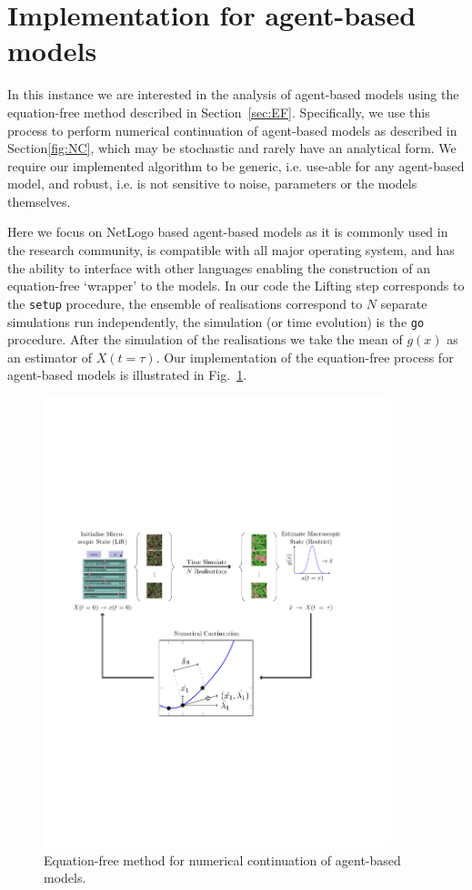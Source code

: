 \documentclass[11pt]{article}
\begin{document}
\section{Implementation for agent-based models}
\label{sec:IMP}
In this instance we are interested in the analysis of agent-based models using the equation-free method described in Section~\ref{sec:EF}. Specifically, we use this process to perform numerical continuation of agent-based models as described in Section\ref{fig:NC}, which may be stochastic and rarely have an analytical form. We require our implemented algorithm to be generic, i.e. use-able for any agent-based model, and robust, i.e. is not sensitive to noise, parameters or the models themselves. 

Here we focus on NetLogo based agent-based models as it is commonly used in the research community, is compatible with all major operating system, and has the ability to interface with other languages enabling the construction of an equation-free `wrapper' to the models. In our code the Lifting step corresponds to the {\tt setup} procedure, the ensemble of realisations correspond to $N$ separate simulations run independently, the simulation (or time evolution) is the {\tt go} procedure. After the simulation of the realisations we take the mean of $g(x)$ as an estimator of $X(t=\tau)$. Our implementation of the equation-free process for agent-based models is illustrated in Fig.~\ref{fig:equationfree}.


\begin{figure}[h]
	\centering
	\includegraphics[width=0.9\textwidth, trim= 1cm 8cm 3cm 8cm, clip=true]{EquationFree}
	\caption{Equation-free method for numerical continuation of agent-based models.  \label{fig:equationfree}}
\end{figure} 
 
\end{document}
